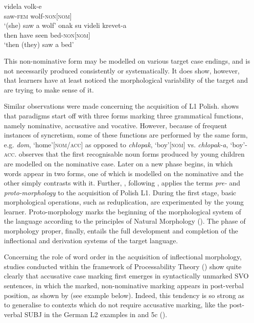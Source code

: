 \ea%
    \label{ex:01:4}
    \ea
    \label{ex:01:4a}
    \gll    videla volk-e\\
            saw-\textsc{fem}  wolf-\textsc{non[nom]}\\
    \glt    ‘(she) saw a wolf’
    \ex
    \label{ex:01:4b}
    \gll    onak su videli krevet-a\\
            then  have  seen  bed-\textsc{non[nom]}\\
    \glt    ‘then (they) saw a bed’
    \z
\z

This non-nominative form may be modelled on various target case endings, and is not necessarily produced consistently or systematically. It does show, however, that learners have at least noticed the morphological variability of the target and are trying to make sense of it.

Similar observations were made concerning the acquisition of L1 Polish. \citet{Łuczyński2002, Łuczyński2004, Łuczyński2010} shows that paradigms start off with three forms marking three grammatical functions, namely nominative, accusative and vocative. However, because of frequent instances of syncretism, some of these functions are performed by the same form, e.g. \textit{dom}, ‘home’\textsc{[nom/acc]} as opposed to \textit{chłopak}, ‘boy’\textsc{[nom]} vs. \textit{chłopak-a}, ‘boy’-\textsc{acc}. \citet{Smoczyńska1972, Smoczyńska1985, Smoczyńska1997} observes that the first recognisable noun forms produced by young children are modelled on the nominative case. Later on a new phase begins, in which words appear in two forms, one of which is modelled on the nominative and the other simply contrasts with it. Further, \citet{Dziubalska-Kołaczyk1997}, following \citet{DresslerKarpf1994}, applies the terms \textit{pre-} and \textit{proto-morphology} to the acquisition of Polish L1. During the first stage, basic morphological operations, such as reduplication, are experimented by the young learner. Proto-morphology marks the beginning of the morphological system of the language according to the principles of Natural Morphology (\citealt{Dressler1985, Dressler1987, Dressler2011, Wurzel1989, Crocco-Galeas1998}). The phase of morphology proper, finally, entails the full development and completion of the inflectional and derivation systems of the target language.

Concerning the role of word order in the acquisition of inflectional morphology, studies conducted within the framework of Processability Theory (\citealt{Pienemann1998, Pienemann2015, Di-BiaseBettoni2015}) show quite clearly that accusative case marking first emerges in syntactically unmarked SVO sentences, in which the marked, non-nominative marking appears in post-verbal position, as shown by  \citet[190]{ArtoniMagnani2015} (see example  below). Indeed, this tendency is so strong as to generalise to contexts which do not require accusative marking, like the post-verbal SUBJ in the German L2 examples in  \citep[490]{Baten2011} and 5c (\citealt[235]{DiehlEtAl2000}).

